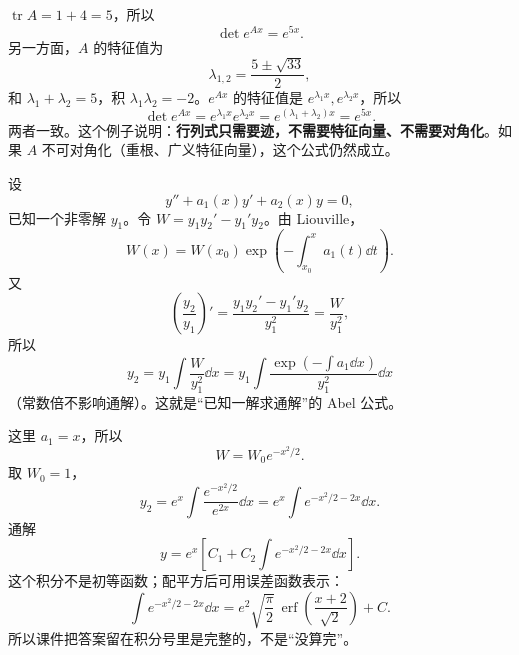 \documentclass[11pt]{ctexart}
\let\orighdr\hdr
\renewcommand{\hdr}[2]{\needspace{12\baselineskip}\orighdr{#1}{#2}}
\let\origsubhdr\subhdr
\renewcommand{\subhdr}[1]{\needspace{3\baselineskip}\origsubhdr{#1}}
\newcommand{\tr}{\operatorname{tr}}
\begin{document}

$\tr A=1+4=5$，所以
\[
\det e^{Ax}=e^{5x}.
\]
另一方面，$A$ 的特征值为
\[
\lambda_{1,2}=\frac{5\pm\sqrt{33}}{2},
\]
和 $\lambda_1+\lambda_2=5$，积 $\lambda_1\lambda_2=-2$。$e^{Ax}$ 的特征值是 $e^{\lambda_1x},e^{\lambda_2x}$，所以
\[
\det e^{Ax}=e^{\lambda_1x}e^{\lambda_2x}
=e^{(\lambda_1+\lambda_2)x}=e^{5x}.
\]
两者一致。这个例子说明：\textbf{行列式只需要迹，不需要特征向量、不需要对角化}。如果 $A$ 不可对角化（重根、广义特征向量），这个公式仍然成立。



设
\[
y''+a_1(x)y'+a_2(x)y=0,
\]
已知一个非零解 $y_1$。令 $W=y_1y_2'-y_1'y_2$。由 Liouville，
\[
W(x)=W(x_0)\exp\!\left(-\int_{x_0}^{x}a_1(t)\dd t\right).
\]
又
\[
\left(\frac{y_2}{y_1}\right)'=\frac{y_1y_2'-y_1'y_2}{y_1^2}
=\frac{W}{y_1^2},
\]
所以
\[
y_2=y_1\int\frac{W}{y_1^2}\dd x
=y_1\int\frac{\exp(-\int a_1\dd x)}{y_1^2}\dd x
\]
（常数倍不影响通解）。这就是“已知一解求通解”的 Abel 公式。


这里 $a_1=x$，所以
\[
W=W_0e^{-x^2/2}.
\]
取 $W_0=1$，
\[
y_2=e^x\int\frac{e^{-x^2/2}}{e^{2x}}\dd x
=e^x\int e^{-x^2/2-2x}\dd x.
\]
通解
\[
y=e^x\left[C_1+C_2\int e^{-x^2/2-2x}\dd x\right].
\]
这个积分不是初等函数；配平方后可用误差函数表示：
\[
\int e^{-x^2/2-2x}\dd x
=e^2\sqrt{\frac{\pi}{2}}\,\operatorname{erf}\!\left(\frac{x+2}{\sqrt2}\right)+C.
\]
所以课件把答案留在积分号里是完整的，不是“没算完”。


\end{document}
